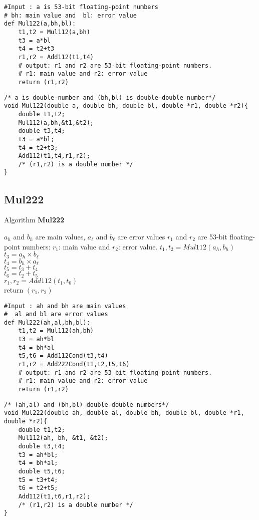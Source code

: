 \begin{lstlisting}
#Input : a is 53-bit floating-point numbers
# bh: main value and  bl: error value
def Mul122(a,bh,bl):
    t1,t2 = Mul112(a,bh)
    t3 = a*bl
    t4 = t2+t3
    r1,r2 = Add112(t1,t4)
    # output: r1 and r2 are 53-bit floating-point numbers.
    # r1: main value and r2: error value
    return (r1,r2)
\end{lstlisting}

\begin{lstlisting}
/* a is double-number and (bh,bl) is double-double number*/
void Mul122(double a, double bh, double bl, double *r1, double *r2){
    double t1,t2;
    Mul112(a,bh,&t1,&t2);
    double t3,t4;
    t3 = a*bl;
    t4 = t2+t3;
    Add112(t1,t4,r1,r2);
    /* (r1,r2) is a double number */
}
\end{lstlisting}
\newpage

\subsection*{Mul222}
\begin{algorithm}[htbp]
  \caption{Algorithm \textbf{Mul222}}
\begin{algorithmic}[1]
\Input $a_h$ and $b_h$ are main values, $a_{\ell}$ and $b_{\ell}$ are error values
\Output $r_1$ and $r_2$ are 53-bit floating-point numbers: $r_1$: main value and $r_2$: error value.
\State $t_1, t_2 = Mul112(a_h,b_h)$\\
$t_3 = a_h\times b_{\ell}$\\
$t_4 = b_h \times a_{\ell}$\\
$t_5 = t_3 +t_4$\\
$t_6 = t_2+t_5$\\
$r_1, r_2 = Add112(t_1,t_6)$\\
    return $(r_1,r_2)$
\end{algorithmic}
\label{algo:Mul222}
\end{algorithm}

\begin{lstlisting}
#Input : ah and bh are main values
#  al and bl are error values
def Mul222(ah,al,bh,bl):
    t1,t2 = Mul112(ah,bh)
    t3 = ah*bl
    t4 = bh*al
    t5,t6 = Add112Cond(t3,t4)
    r1,r2 = Add222Cond(t1,t2,t5,t6)
    # output: r1 and r2 are 53-bit floating-point numbers.
    # r1: main value and r2: error value
    return (r1,r2)
\end{lstlisting}

\begin{lstlisting}
/* (ah,al) and (bh,bl) double-double numbers*/
void Mul222(double ah, double al, double bh, double bl, double *r1, double *r2){
    double t1,t2;
    Mul112(ah, bh, &t1, &t2);
    double t3,t4;
    t3 = ah*bl;
    t4 = bh*al;
    double t5,t6;
    t5 = t3+t4;
    t6 = t2+t5;
    Add112(t1,t6,r1,r2);
    /* (r1,r2) is a double number */
}
\end{lstlisting}
\newpage


